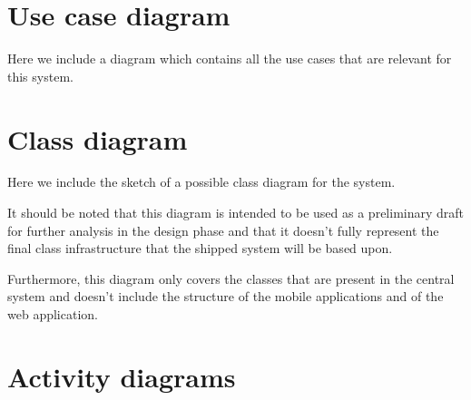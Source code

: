 \section{Use case diagram}
Here we include a diagram which contains all the use cases that are relevant for this system.
\begin{landscape}

\end{landscape}


\section{Class diagram}
Here we include the sketch of a possible class diagram for the system. 

It should be noted that this diagram is intended to be used as a preliminary draft for further analysis in the design phase and that it doesn't fully represent the final class infrastructure that the shipped system will be based upon.

Furthermore, this diagram only covers the classes that are present in the central system and doesn't include the structure of the mobile applications and of the web application.

\begin{landscape}
%

\end{landscape}


\section{Activity diagrams}
